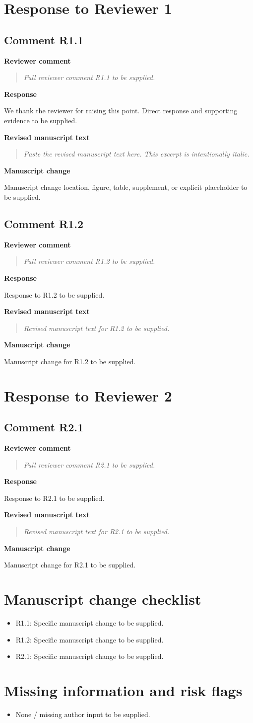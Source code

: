 \documentclass[11pt]{article}
\newcommand{\ReviewerComment}[1]{%
  \par\noindent\textbf{Reviewer comment}\par
  \begin{quote}\itshape #1\end{quote}
}
\newcommand{\AuthorResponse}[1]{%
  \par\noindent\textbf{Response}\par
  #1\par
}
\newcommand{\RevisedExcerpt}[1]{%
  \par\noindent\textbf{Revised manuscript text}\par
  \begin{quote}\itshape #1\end{quote}
}
\newcommand{\ManuscriptChange}[1]{%
  \par\noindent\textbf{Manuscript change}\par
  #1\par
}
\newcommand{\ReviewerSection}[1]{%
  \clearpage
  \section*{Response to Reviewer #1}
}
\begin{document}
\ReviewerSection{1}

\subsection*{Comment R1.1}
\ReviewerComment{Full reviewer comment R1.1 to be supplied.}
\AuthorResponse{We thank the reviewer for raising this point. Direct response and supporting evidence to be supplied.}
\RevisedExcerpt{Paste the revised manuscript text here. This excerpt is intentionally italic.}
\ManuscriptChange{Manuscript change location, figure, table, supplement, or explicit placeholder to be supplied.}

\subsection*{Comment R1.2}
\ReviewerComment{Full reviewer comment R1.2 to be supplied.}
\AuthorResponse{Response to R1.2 to be supplied.}
\RevisedExcerpt{Revised manuscript text for R1.2 to be supplied.}
\ManuscriptChange{Manuscript change for R1.2 to be supplied.}

\ReviewerSection{2}

\subsection*{Comment R2.1}
\ReviewerComment{Full reviewer comment R2.1 to be supplied.}
\AuthorResponse{Response to R2.1 to be supplied.}
\RevisedExcerpt{Revised manuscript text for R2.1 to be supplied.}
\ManuscriptChange{Manuscript change for R2.1 to be supplied.}

\section*{Manuscript change checklist}

\begin{itemize}[leftmargin=*]
  \item R1.1: Specific manuscript change to be supplied.
  \item R1.2: Specific manuscript change to be supplied.
  \item R2.1: Specific manuscript change to be supplied.
\end{itemize}

\section*{Missing information and risk flags}

\begin{itemize}[leftmargin=*]
  \item None / missing author input to be supplied.
\end{itemize}
\end{document}
